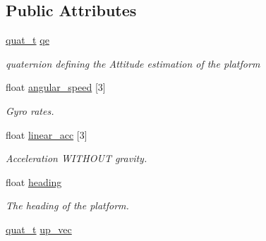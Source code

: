 \subsection*{Public Attributes}
\begin{DoxyCompactItemize}
\item 
\hypertarget{structahrs__t_aef0bbf1571232385d775fa7c8ebaad35}{\hyperlink{structquat__t}{quat\+\_\+t} \hyperlink{structahrs__t_aef0bbf1571232385d775fa7c8ebaad35}{qe}}\label{structahrs__t_aef0bbf1571232385d775fa7c8ebaad35}

\begin{DoxyCompactList}\small\item\em quaternion defining the Attitude estimation of the platform \end{DoxyCompactList}\item 
\hypertarget{structahrs__t_a129b4abdf512e3e2fc554999a564a629}{float \hyperlink{structahrs__t_a129b4abdf512e3e2fc554999a564a629}{angular\+\_\+speed} \mbox{[}3\mbox{]}}\label{structahrs__t_a129b4abdf512e3e2fc554999a564a629}

\begin{DoxyCompactList}\small\item\em Gyro rates. \end{DoxyCompactList}\item 
\hypertarget{structahrs__t_aa0ecddf93d45bcecd956a0196326de72}{float \hyperlink{structahrs__t_aa0ecddf93d45bcecd956a0196326de72}{linear\+\_\+acc} \mbox{[}3\mbox{]}}\label{structahrs__t_aa0ecddf93d45bcecd956a0196326de72}

\begin{DoxyCompactList}\small\item\em Acceleration W\+I\+T\+H\+O\+U\+T gravity. \end{DoxyCompactList}\item 
\hypertarget{structahrs__t_ae09721c1c399612fadee8b1dedd4fcca}{float \hyperlink{structahrs__t_ae09721c1c399612fadee8b1dedd4fcca}{heading}}\label{structahrs__t_ae09721c1c399612fadee8b1dedd4fcca}

\begin{DoxyCompactList}\small\item\em The heading of the platform. \end{DoxyCompactList}\item 
\hypertarget{structahrs__t_a0f0306bdf82fde8ceb1b20289f00260f}{\hyperlink{structquat__t}{quat\+\_\+t} \hyperlink{structahrs__t_a0f0306bdf82fde8ceb1b20289f00260f}{up\+\_\+vec}}\label{structahrs__t_a0f0306bdf82fde8ceb1b20289f00260f}


\end{DoxyCompactItemize}
